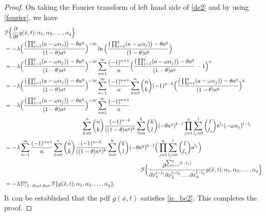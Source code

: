 \documentclass[12pt,oneside,reqno]{amsart}
\numberwithin{equation}{section}
\theoremstyle{definition}
\numberwithin{equation}{section}
\theoremstyle{remarkstyle}
\begin{document}
\begin{proof}
On taking the Fourier transform of left hand side of \eqref{de2} and by using \eqref{fourier}, we have
{\small	\begin{align*}
		&\mathcal{F}\Big\{\frac{\partial}{\partial t}g(\bar{x},t);\alpha_1,\alpha_2,\dots,\alpha_q\Big\}\\
		&=-\lambda \Big(\frac{\big(\prod_{j=1}^{q}(a-\omega\alpha_j)\big)-\theta a^q}{(1-\theta)a^q}\Big)^{-\lambda t} \ln \Big(\frac{\big(\prod_{j=1}^{q}(a-\omega\alpha_j)\big)-\theta a^q}{(1-\theta)a^q}\Big)\\
		&=-\lambda \Big(\frac{\big(\prod_{j=1}^{q}(a-\omega\alpha_j)\big)-\theta a^q}{(1-\theta)a^q}\Big)^{-\lambda t}\sum_{n=1}^{\infty}\frac{(-1)^{n+1}}{n}\Big(\frac{\big(\prod_{j=1}^{q}(a-\omega\alpha_j)\big)-\theta a^q}{(1-\theta)a^q}-1\Big)^n\\
		&=-\lambda\Big(\frac{\big(\prod_{j=1}^{q}(a-\omega\alpha_j)\big)-\theta a^q}{(1-\theta)a^q}\Big)^{-\lambda t}\sum_{n=1}^{\infty}\frac{(-1)^{n+1}}{n} \sum_{k=0}^{n}{n\choose k}(-1)^{n-k}\Big(\frac{\big(\prod_{j=1}^{q}(a-\omega\alpha_j)\big)-\theta a^q}{(1-\theta)a^q}\Big)^k \\
		&=-\lambda\Big(\frac{\big(\prod_{j=1}^{q}(a-\omega\alpha_j)\big)-\theta a^q}{(1-\theta)a^q}\Big)^{-\lambda t}\sum_{n=1}^{\infty}\frac{(-1)^{n+1}}{n}\\ 
		&\hspace{4.5cm}\cdot\sum_{k=0}^{n}{n\choose k}\frac{(-1)^{n-k}}{((1-\theta)a^q)^k}\sum_{l=0}^{k}{k\choose l}(-\theta a^q)^{k-l} \prod_{j=1}^{q}\sum_{l_j=0}^{l}{l \choose l_j}a^{l_j}(-\omega\alpha_j)^{l-l_j}\\
		&=-\lambda\sum_{n=1}^{\infty}\frac{(-1)^{n+1}}{n} \sum_{k=0}^{n}{n\choose k}\frac{(-1)^{n-k}}{((1-\theta)a^q)^k}\sum_{l=0}^{k}{k\choose l}(-\theta a^q)^{k-l}\Big(\prod_{j=1}^{q}\sum_{l_j=0}^{l}{l \choose l_j}a^{l_j}\Big)\\
		&\hspace{8cm}\cdot \mathcal{F}\Bigl\{\frac{\partial^{\sum_{j=1}^{q}(l-l_j)}}{\partial x_1^{l-l_1}\partial x_2^{l-l_2}\dots\partial x_q^{l-l_q}}g(\bar{x},t);\alpha_1,\alpha_2,\dots,\alpha_q\Bigr\}\\
		&=-\lambda \mathcal{D}_{(1-\theta)a^q,\theta a^q}^a\,\mathcal{F}\{g(\bar{x},t);\alpha_1,\alpha_2,\dots,\alpha_q\}.
	\end{align*}}
It can be established that the pdf $g(\bar{x},t)$ satisfies \eqref{ic_bc2}. This completes the proof.
\end{proof}
\end{document}
